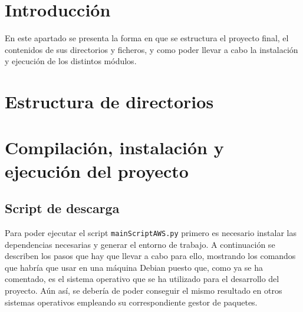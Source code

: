 
\section{Introducción}

En este apartado se presenta la forma en que se estructura el proyecto final, el contenidos de sus directorios y ficheros, y como poder llevar a cabo la instalación y ejecución de los distintos módulos.


\section{Estructura de directorios}


\section{Compilación, instalación y ejecución del proyecto}

\subsection{Script de descarga}

Para poder ejecutar el script \texttt{mainScriptAWS.py} primero es necesario instalar las dependencias necesarias y generar el entorno de trabajo. A continuación se describen los pasos que hay que llevar a cabo para ello, mostrando los comandos que habría que usar en una máquina Debian puesto que, como ya se ha comentado, es el sistema operativo que se ha utilizado para el desarrollo del proyecto. Aún así, se debería de poder conseguir el mismo resultado en otros sistemas operativos empleando su correspondiente gestor de paquetes.

